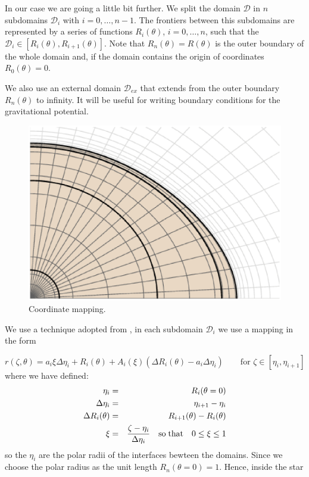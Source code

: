 In our case we are going a little bit further. We split
the domain $\mathcal{D}$ in $n$ subdomains $\mathcal{D}_i$ with
$i=0,\ldots,n-1$. The frontiers between this subdomains are represented
by a series of functions $R_i(\theta)$, $i=0,\ldots,n$, such that
the $\mathcal{D}_i\in[R_{i}(\theta),R_{i+1}(\theta)]$.  Note that
$R_n(\theta)=R(\theta)$ is the outer boundary of the whole domain and,
if the domain contains the origin of coordinates $R_0(\theta)=0$.

We also use an external domain $\mathcal{D}_{ex}$ that extends from the
outer boundary $R_n(\theta)$ to infinity. It will be useful for writing
boundary conditions for the gravitational potential.

\begin{figure}[t]
\centering
\includegraphics[width=0.8\linewidth]{fig/mapping.ps}
\caption{Coordinate mapping.}
\end{figure}


We use a technique adopted from \cite{BGM98}, in each subdomain
$\mathcal{D}_i$ we use a mapping in the form

\begin{equation}
\label{eq:map}
r(\zeta,\theta)=a_i\xi\Delta\eta_i+R_i(\theta)+A_i(\xi)(\Delta R_i(\theta)-a_i\Delta\eta_i) 
\qquad \mbox{for $\zeta\in[\eta_i,\eta_{i+1}]$}
\end{equation}
where we have defined:
\begin{eqnarray*}
\eta_i&=&R_i(\theta=0)\\
\Delta\eta_i&=&\eta_{i+1}-\eta_i\\
\Delta R_i(\theta)&=&R_{i+1}(\theta)-R_{i}(\theta)\\
\xi&=&\displaystyle\frac{\zeta-\eta_i}{\Delta\eta_i} \quad {\rm so\;
that}\quad 0\leq\xi\leq 1
\end{eqnarray*} 
so the $\eta_i$ are the polar radii of the interfaces bewteen the domains.
Since we choose the polar radius as the unit length $R_n(\theta=0)=1$. Hence,
inside the star

